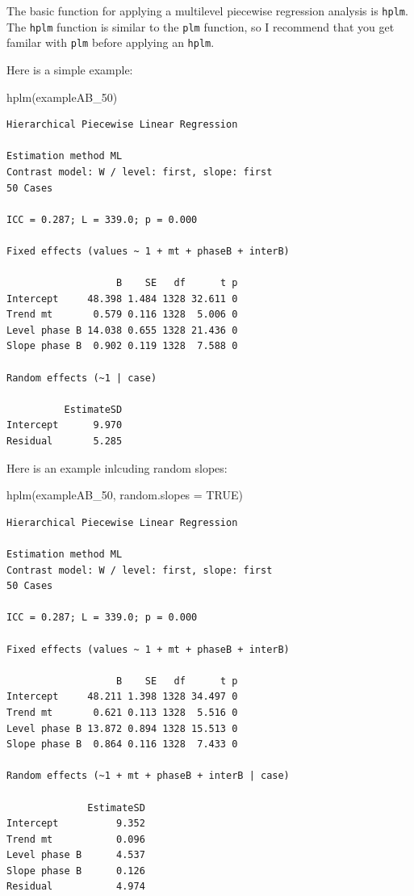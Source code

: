 \documentclass[
  letterpaper,
  DIV=11,
  numbers=noendperiod]{scrreprt}
\newenvironment{Shaded}{\begin{snugshade}}{\end{snugshade}}
\newcommand{\AttributeTok}[1]{\textcolor[rgb]{0.40,0.45,0.13}{#1}}
\newcommand{\ConstantTok}[1]{\textcolor[rgb]{0.56,0.35,0.01}{#1}}
\newcommand{\FunctionTok}[1]{\textcolor[rgb]{0.28,0.35,0.67}{#1}}
\newcommand{\NormalTok}[1]{\textcolor[rgb]{0.00,0.23,0.31}{#1}}
\begin{document}
The basic function for applying a multilevel piecewise regression
analysis is \texttt{hplm}. The \texttt{hplm} function is similar to the
\texttt{plm} function, so I recommend that you get familar with
\texttt{plm} before applying an \texttt{hplm}.

Here is a simple example:

\begin{Shaded}
\begin{Highlighting}[]
\FunctionTok{hplm}\NormalTok{(exampleAB\_50)}
\end{Highlighting}
\end{Shaded}

\begin{verbatim}
Hierarchical Piecewise Linear Regression

Estimation method ML 
Contrast model: W / level: first, slope: first
50 Cases

ICC = 0.287; L = 339.0; p = 0.000

Fixed effects (values ~ 1 + mt + phaseB + interB)

                   B    SE   df      t p
Intercept     48.398 1.484 1328 32.611 0
Trend mt       0.579 0.116 1328  5.006 0
Level phase B 14.038 0.655 1328 21.436 0
Slope phase B  0.902 0.119 1328  7.588 0

Random effects (~1 | case)

          EstimateSD
Intercept      9.970
Residual       5.285
\end{verbatim}

Here is an example inlcuding random slopes:

\begin{Shaded}
\begin{Highlighting}[]
\FunctionTok{hplm}\NormalTok{(exampleAB\_50, }\AttributeTok{random.slopes =} \ConstantTok{TRUE}\NormalTok{)}
\end{Highlighting}
\end{Shaded}

\begin{verbatim}
Hierarchical Piecewise Linear Regression

Estimation method ML 
Contrast model: W / level: first, slope: first
50 Cases

ICC = 0.287; L = 339.0; p = 0.000

Fixed effects (values ~ 1 + mt + phaseB + interB)

                   B    SE   df      t p
Intercept     48.211 1.398 1328 34.497 0
Trend mt       0.621 0.113 1328  5.516 0
Level phase B 13.872 0.894 1328 15.513 0
Slope phase B  0.864 0.116 1328  7.433 0

Random effects (~1 + mt + phaseB + interB | case)

              EstimateSD
Intercept          9.352
Trend mt           0.096
Level phase B      4.537
Slope phase B      0.126
Residual           4.974
\end{verbatim}
\end{document}
